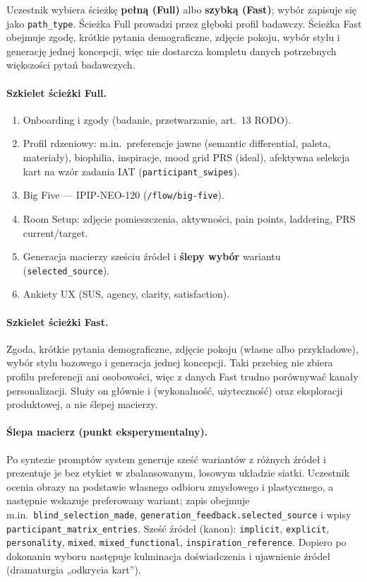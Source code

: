 Uczestnik wybiera ścieżkę \textbf{pełną (Full)} albo \textbf{szybką (Fast)}; wybór zapisuje się jako \texttt{path\_type}. Ścieżka Full prowadzi przez głęboki profil badawczy. Ścieżka Fast obejmuje zgodę, krótkie pytania demograficzne, zdjęcie pokoju, wybór stylu i generację jednej koncepcji, więc nie dostarcza kompletu danych potrzebnych większości pytań badawczych.

\paragraph{Szkielet ścieżki Full.}
\begin{enumerate}
  \item Onboarding i zgody (badanie, przetwarzanie, art.~13 RODO).
  \item Profil rdzeniowy: m.in.\ preferencje jawne (semantic differential, paleta, materiały), biophilia, inspiracje, mood grid PRS (ideal), afektywna selekcja kart na wzór zadania IAT (\texttt{participant\_swipes}).
  \item Big Five --- IPIP-NEO-120 (\texttt{/flow/big-five}).
  \item Room Setup: zdjęcie pomieszczenia, aktywności, pain points, laddering, PRS current/target.
  \item Generacja macierzy sześciu źródeł i \textbf{ślepy wybór} wariantu (\texttt{selected\_source}).
  \item Ankiety UX (SUS, agency, clarity, satisfaction).
\end{enumerate}

\paragraph{Szkielet ścieżki Fast.}
Zgoda, krótkie pytania demograficzne, zdjęcie pokoju (własne albo przykładowe), wybór stylu bazowego i generacja jednej koncepcji. Taki przebieg nie zbiera profilu preferencji ani osobowości, więc z danych Fast trudno porównywać kanały personalizacji. Służy on głównie  i  (wykonalność, użyteczność) oraz eksploracji produktowej, a nie ślepej macierzy.

\paragraph{Ślepa macierz (punkt eksperymentalny).}
Po syntezie promptów system generuje sześć wariantów z różnych źródeł i prezentuje je bez etykiet w zbalansowanym, losowym układzie siatki. Uczestnik ocenia obrazy na podstawie własnego odbioru zmysłowego i plastycznego, a następnie wskazuje preferowany wariant; zapis obejmuje m.in.\ \texttt{blind\_selection\_made}, \texttt{generation\_feedback.selected\_source} i wpisy \texttt{participant\_matrix\_entries}. Sześć źródeł (kanon): \texttt{implicit}, \texttt{explicit}, \texttt{personality}, \texttt{mixed}, \texttt{mixed\_functional}, \texttt{inspiration\_reference}. Dopiero po dokonaniu wyboru następuje kulminacja doświadczenia i ujawnienie źródeł (dramaturgia „odkrycia kart”).

